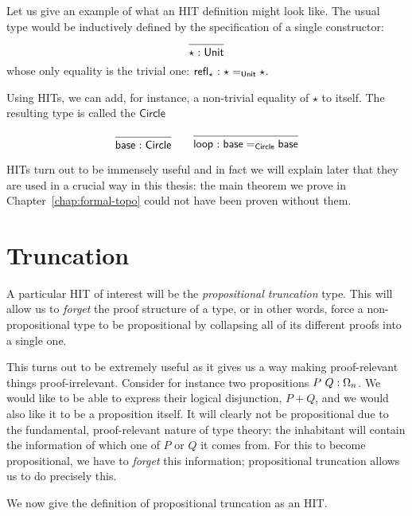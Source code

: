 Let us give an example of what an HIT definition might look like. The usual $\unit{}$
type would be inductively defined by the specification of a single constructor:
\begin{equation*}
  \begin{prooftree}
    \infer0{\oftyI{\star}{\unit{}}}
  \end{prooftree}
\end{equation*}
whose only equality is the trivial one: $\mathsf{refl}_\star\hspace{0.1mm}:\hspace{0.1mm}\star =_{\mathsf{Unit}{}} \star$.

Using HITs, we can add, for instance, a non-trivial equality of $\star$ to itself. The
resulting type is called the $\mathsf{Circle}$

\begin{equation*}
  \begin{prooftree}
    \infer0{\oftyI{\mathsf{base}}{\mathsf{Circle}}}
  \end{prooftree}
  \hspace{2em}
  \begin{prooftree}
    \infer0{\oftyI{\mathsf{loop}}{\mathsf{base} =_{\mathsf{Circle}} \mathsf{base}}}
  \end{prooftree}
\end{equation*}

HITs turn out to be immensely useful and in fact we will explain later that they are used
in a crucial way in this thesis: the main theorem we prove in
Chapter~\ref{chap:formal-topo} could not have been proven without them.

\section{Truncation}

A particular HIT of interest will be the \emph{propositional truncation} type. This will
allow us to \emph{forget} the proof structure of a type, or in other words, force a
non-propositional type to be propositional by collapsing all of its different proofs into
a single one.

This turns out to be extremely useful as it gives us a way making proof-relevant things
proof-irrelevant. Consider for instance two propositions $P~Q:\Omega_n$. We would
like to be able to express their logical disjunction, $P + Q$, and we would also like it
to be a proposition itself. It will clearly not be propositional due to the fundamental,
proof-relevant nature of type theory: the inhabitant will contain the information of which
one of $P$ or $Q$ it comes from. For this to become propositional, we have to
\emph{forget} this information; propositional truncation allows us to do precisely this.

We now give the definition of propositional truncation as an HIT.

\begin{defn}\label{defn:truncation}
\end{defn}
